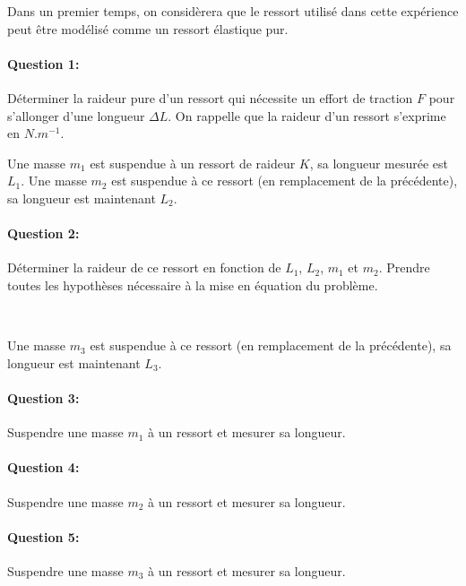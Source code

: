 



Dans un premier temps, on considèrera que le ressort utilisé dans cette expérience peut être modélisé comme un ressort élastique pur. 

\paragraph{Question 1:} Déterminer la raideur pure d'un ressort qui nécessite un effort de traction $F$ pour s'allonger d'une longueur $\Delta L$. On rappelle que la raideur d'un ressort s'exprime en $N.m^{-1}$.

Une masse $m_1$ est suspendue à un ressort de raideur $K$, sa longueur mesurée est $L_1$. Une masse $m_2$ est suspendue à ce ressort (en remplacement de la précédente), sa longueur est maintenant $L_2$.

\paragraph{Question 2:} Déterminer la raideur de ce ressort en fonction de $L_1$, $L_2$, $m_1$ et $m_2$. Prendre toutes les hypothèses nécessaire à la mise en équation du problème.

~\

Une masse $m_3$ est suspendue à ce ressort (en remplacement de la précédente), sa longueur est maintenant $L_3$.


\paragraph{Question 3:} Suspendre une masse $m_1$ à un ressort et mesurer sa longueur.

\paragraph{Question 4:} Suspendre une masse $m_2$ à un ressort et mesurer sa longueur.

\paragraph{Question 5:} Suspendre une masse $m_3$ à un ressort et mesurer sa longueur.

